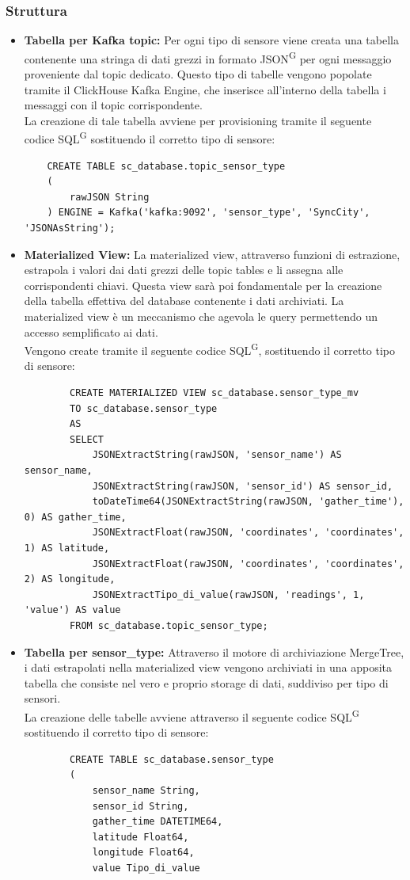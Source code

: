 \documentclass[8pt]{article}
\newcommand{\glossterm}[1]{#1\textsuperscript{G}} %
\begin{document}
\subsubsection{Struttura}
\begin{itemize}
    \item \textbf{Tabella per Kafka topic:} Per ogni tipo di sensore viene creata una tabella contenente una stringa di dati grezzi in formato \glossterm{JSON} per ogni messaggio proveniente dal topic dedicato. Questo tipo di tabelle vengono popolate tramite il ClickHouse Kafka Engine, che inserisce all’interno della tabella i messaggi con il topic corrispondente.
    \\La creazione di tale tabella avviene per provisioning tramite il seguente codice \glossterm{SQL} sostituendo il corretto tipo di sensore:
    \begin{verbatim}
    CREATE TABLE sc_database.topic_sensor_type
    (
        rawJSON String
    ) ENGINE = Kafka('kafka:9092', 'sensor_type', 'SyncCity', 'JSONAsString');
    \end{verbatim}
    \item \textbf{Materialized View:} La materialized view, attraverso funzioni di estrazione, estrapola i valori dai dati grezzi delle topic tables e li assegna alle corrispondenti chiavi. Questa view sarà poi fondamentale per la creazione della tabella effettiva del database contenente i dati archiviati. La materialized view è un meccanismo che agevola le query permettendo un accesso semplificato ai dati. 
    \\Vengono create tramite il seguente codice \glossterm{SQL}, sostituendo il corretto tipo di sensore:
    \begin{verbatim}
        CREATE MATERIALIZED VIEW sc_database.sensor_type_mv
        TO sc_database.sensor_type
        AS
        SELECT
            JSONExtractString(rawJSON, 'sensor_name') AS sensor_name,
            JSONExtractString(rawJSON, 'sensor_id') AS sensor_id,
            toDateTime64(JSONExtractString(rawJSON, 'gather_time'), 0) AS gather_time,
            JSONExtractFloat(rawJSON, 'coordinates', 'coordinates', 1) AS latitude,
            JSONExtractFloat(rawJSON, 'coordinates', 'coordinates', 2) AS longitude,
            JSONExtractTipo_di_value(rawJSON, 'readings', 1, 'value') AS value
        FROM sc_database.topic_sensor_type;
    \end{verbatim}
    \item \textbf{Tabella per sensor\_type:} Attraverso il motore di archiviazione MergeTree, i dati estrapolati nella materialized view vengono archiviati in una apposita tabella che consiste nel vero e proprio storage di dati, suddiviso per tipo di sensori.
    \\La creazione delle tabelle avviene attraverso il seguente codice \glossterm{SQL} sostituendo il corretto tipo di sensore:
    \begin{verbatim}
        CREATE TABLE sc_database.sensor_type
        (
            sensor_name String,
            sensor_id String,
            gather_time DATETIME64,
            latitude Float64,
            longitude Float64,
            value Tipo_di_value
        

\end{verbatim}
\end{itemize}
\end{document}
